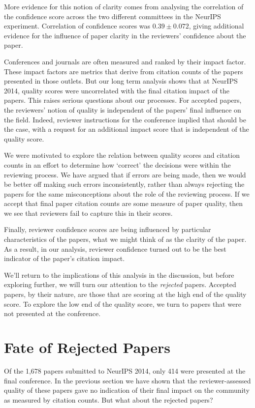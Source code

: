 \documentclass[twoside]{article}
\begin{document}
More evidence for this notion of clarity comes from analysing the
correlation of the confidence score across the two different
committees in the NeurIPS experiment. Correlation of confidence scores
was $0.39 \pm 0.072$, giving additional evidence for
the influence of paper clarity in the reviewers' confidence about the paper.

Conferences and journals are often measured and ranked by their impact
factor. These impact factors are metrics that derive from citation
counts of the papers presented in those outlets. But our long term
analysis shows that at NeurIPS 2014, quality scores were uncorrelated
with the final citation impact of the papers. This raises serious
questions about our processes. For accepted papers, the reviewers' notion of quality is independent of the papers' final
influence on the field. Indeed, reviewer instructions for the
conference implied that should be the case, with a request for an
additional impact score that is independent of the quality score.

We were motivated to explore the relation between quality scores and
citation counts in an effort to determine how `correct' the decisions
were within the reviewing process. We have argued that if errors are
being made, then we would be better off making such errors
inconsistently, rather than always rejecting the papers for the same
misconceptions about the role of the reviewing process. If we accept
that final paper citation counts are some measure of paper quality,
then we see that reviewers fail to capture this in their scores.

Finally, reviewer confidence scores are being influenced by particular
characteristics of the papers, what we might think of as the clarity
of the paper. As a result, in our analysis, reviewer confidence turned
out to be the best indicator of the paper's citation impact.

We'll return to the implications of this analysis in the discussion,
but before exploring further, we will turn our attention to the
\emph{rejected} papers. Accepted papers, by their nature, are those
that are scoring at the high end of the quality score. To explore the
low end of the quality score, we turn to papers that were not
presented at the conference.

\section{Fate of Rejected Papers}

Of the 1,678 papers submitted to NeurIPS 2014, only 414 were presented
at the final conference. In the previous section we have shown that
the reviewer-assessed quality of these papers gave no indication of
their final impact on the community as measured by citation
counts. But what about the rejected papers?
\end{document}

